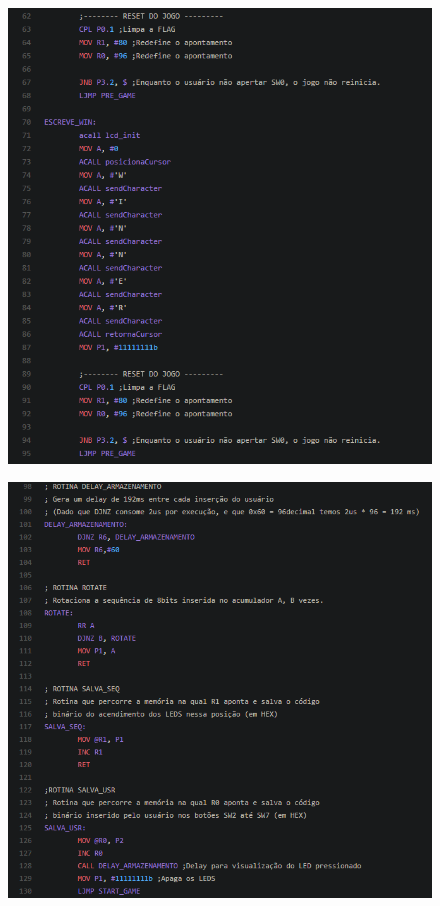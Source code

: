 \documentclass{article}
\begin{document}
\begin{figure}[H]
\hspace*{-1.0in}
\includegraphics[scale=1]{3.PNG}
\end{figure}
\begin{figure}[H]
\hspace*{-1.0in}
\includegraphics[scale=1]{4.PNG}
\end{figure}
\end{document}
